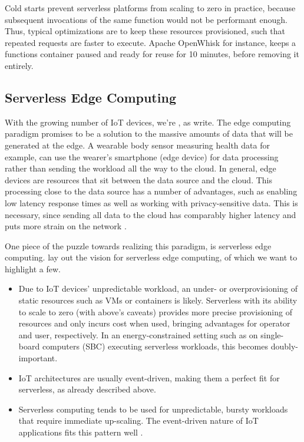 Cold starts prevent serverless platforms from scaling to zero in practice, because subsequent invocations of the same function would not be performant enough. Thus, typical optimizations are to keep these resources provisioned, such that repeated requests are faster to execute. Apache OpenWhisk for instance, keeps a functions container paused and ready for reuse for 10 minutes, before removing it entirely.

\subsection{Serverless Edge Computing}

With the growing number of IoT devices, we're , as \citeauthor{Shi2016} write. The edge computing paradigm promises to be a solution to the massive amounts of data that will be generated at the edge. A wearable body sensor measuring health data for example, can use the wearer's smartphone (edge device) for data processing rather than sending the workload all the way to the cloud. In general, edge devices are resources that sit between the data source and the cloud. This processing close to the data source has a number of advantages, such as enabling low latency response times as well as working with privacy-sensitive data. This is necessary, since sending all data to the cloud has comparably higher latency and puts more strain on the network \cite{Shi2016}.

One piece of the puzzle towards realizing this paradigm, is serverless edge computing. \citeauthor{Aslanpour2021} lay out the vision for serverless edge computing, of which we want to highlight a few.

\begin{itemize}
    \item Due to IoT devices' unpredictable workload, an under- or overprovisioning of static resources such as VMs or containers is likely. Serverless with its ability to scale to zero (with above's caveats) provides more precise provisioning of resources and only incurs cost when used, bringing advantages for operator and user, respectively. In an energy-constrained setting such as on single-board computers (SBC) executing serverless workloads, this becomes doubly-important.
    \item IoT architectures are usually event-driven, making them a perfect fit for serverless, as already described above.
    \item Serverless computing tends to be used for unpredictable, bursty workloads that require immediate up-scaling. The event-driven nature of IoT applications fits this pattern well \cite{Aslanpour2021}.
\end{itemize}

